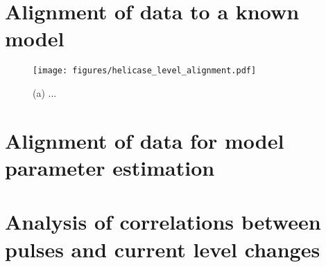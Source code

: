 \section{Alignment of data to a known model}
\label{level_alignment}

\begin{figure}[h]
\begin{centering}
\texttt{[image: figures/helicase\_level\_alignment.pdf]}
\caption[Data analysis: level alignment to model]{(a) ...}
\label{fig:data_analysis_alignment}
\end{centering}
\end{figure}

\section{Alignment of data for model parameter estimation}


\section{Analysis of correlations between pulses and current level changes}

